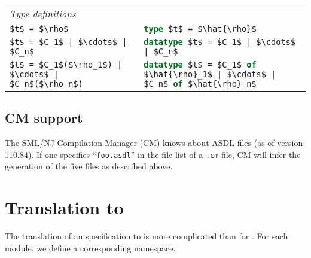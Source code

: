 \begin{table}[tp]
\begin{center}
\begin{tabular}{|l|p{3in}|}
      \hline
      \textit{Type definitions} & \\[0.25em]
      \lstinline[language=ASDL,mathescape=true]@$t$ = $\rho$@
        & \lstinline[language=SML,mathescape=true]!type $t$ = $\hat{\rho}$! \\[0.5em]
      \lstinline[language=ASDL,mathescape=true]@$t$ = $C_1$ | $\cdots$ | $C_n$@
        & \lstinline[language=SML,mathescape=true]!datatype $t$ = $C_1$ | $\cdots$ | $C_n$! \\[0.5em]
      \lstinline[language=ASDL,mathescape=true]@$t$ = $C_1$($\rho_1$) | $\cdots$ | $C_n$($\rho_n$)@
        & \lstinline[language=SML,mathescape=true]!datatype $t$ = $C_1$ of $\hat{\rho}_1$ | $\cdots$ | $C_n$ of $\hat{\rho}_n$! \\[0.25em]
      \hline
    \end{tabular}%
  \end{center}%
\end{table}%

\subsection{CM support}
The SML/NJ Compilation Manager (CM) knows about ASDL files (as of version 110.84).
If one specifies ``\texttt{foo.asdl}'' in the file list of a \texttt{.cm} file, CM will
infer the generation of the five \sml{} files as described above.

\section{Translation to \Cplusplus{}}

The translation of an \asdl{} specification to \Cplusplus{} is more complicated than for \sml{}.
For each \asdl{} module, we define a corresponding \Cplusplus{} namespace.

